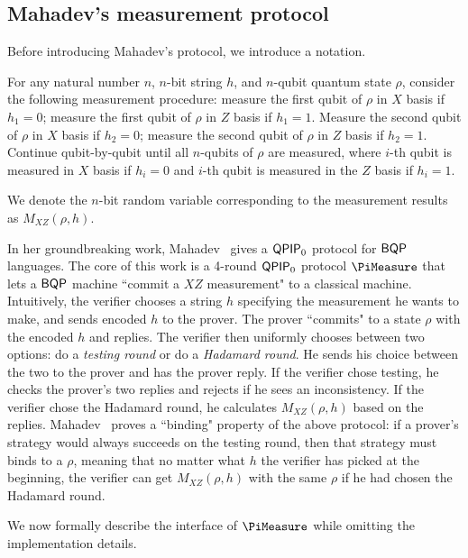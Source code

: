 \subsection{Mahadev's measurement protocol}\label{sec:urmila4}

Before introducing Mahadev's protocol, we introduce a notation.

\begin{definition}[$M_{XZ}(\rho,h)$]

	For any natural number $n$, $n$-bit string $h$, and $n$-qubit quantum state $\rho$, consider the following measurement procedure: measure the first qubit of $\rho$ in $X$ basis if $h_1=0$; measure the first qubit of $\rho$ in $Z$ basis if $h_1=1$.  Measure the second qubit of $\rho$ in $X$ basis if $h_2=0$; measure the second qubit of $\rho$ in $Z$ basis if $h_2=1$. Continue qubit-by-qubit until all $n$-qubits of $\rho$ are measured, where $i$-th qubit is measured in $X$ basis if $h_i=0$ and  $i$-th qubit is measured in the $Z$ basis if $h_i=1$.

	We denote the $n$-bit random variable corresponding to the measurement results as $M_{XZ}(\rho,h)$.

\end{definition}

In her groundbreaking work, Mahadev~\cite{FOCS:Mahadev18a} gives a $\operatorname{\mathsf{QPIP}}_0$ protocol for $\operatorname{\mathsf{BQP}}$ languages.
The core of this work is a 4-round $\operatorname{\mathsf{QPIP}}_0$ protocol $\PiMeasure$ that lets a $\operatorname{\mathsf{BQP}}$ machine ``commit a $XZ$ measurement" to a classical machine.
Intuitively, the verifier chooses a string $h$ specifying  the measurement he wants to make, and sends encoded $h$  to the prover. The prover ``commits" to a state $\rho$ with the encoded $h$ and replies. The verifier then uniformly chooses between two options: do a \emph{testing round} or do a \emph{Hadamard round}. He sends his choice between the two to the prover and has the  prover reply. If the verifier chose testing, he checks the prover's two replies and rejects if he sees an inconsistency. If the verifier chose the Hadamard round, he calculates $M_{XZ}(\rho,h)$ based on the replies. Mahadev~\cite{FOCS:Mahadev18a} proves a ``binding" property of the above protocol: if a prover's strategy would always succeeds on the testing round, then that strategy must binds to a $\rho$, meaning that no matter what $h$ the verifier has picked at the beginning, the verifier can get $M_{XZ}(\rho,h)$  with the same $\rho$ if he had chosen the Hadamard round.

We now formally describe the interface of $\PiMeasure$ while omitting the implementation details.

